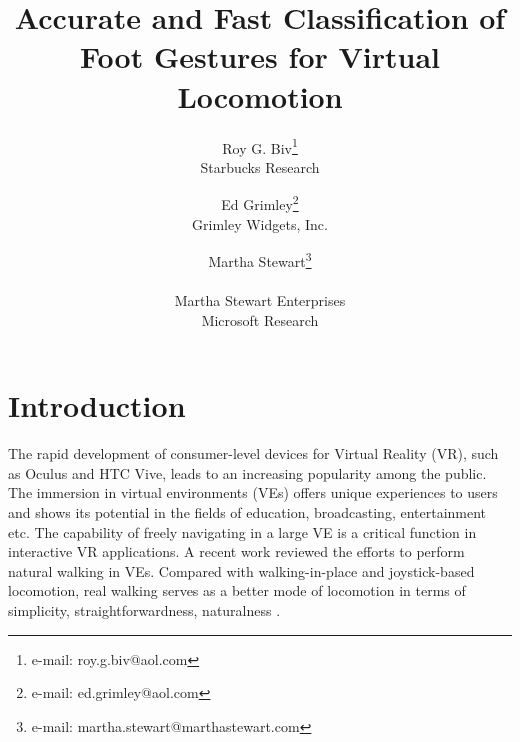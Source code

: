 \documentclass[review]{vgtc}                 %
\title{Accurate and Fast Classification of Foot Gestures for Virtual Locomotion}
\author{Roy G. Biv\thanks{e-mail: roy.g.biv@aol.com}\\ %
        \scriptsize Starbucks Research %
\and Ed Grimley\thanks{e-mail: ed.grimley@aol.com}\\ %
     \scriptsize Grimley Widgets, Inc. %
\and Martha Stewart\thanks{e-mail: martha.stewart@marthastewart.com}\\ %
     \parbox{1.4in}{\scriptsize \centering Martha Stewart Enterprises \\ Microsoft Research}}
\begin{document}
\newcommand{\shihuinote}[1]{\textcolor{red}{#1}}


\maketitle


\section{Introduction}
\label{sec:introduction}
The rapid development of consumer-level devices for Virtual Reality (VR), such as Oculus and HTC Vive, leads to an increasing popularity among the public.
The immersion in virtual environments (VEs) offers unique experiences to users and shows its potential in the fields of education, broadcasting, entertainment etc.
The capability of freely navigating in a large VE is a critical function in interactive VR applications.
A recent work \cite{nilsson2018natural} reviewed the efforts to perform natural walking in VEs.
Compared with walking-in-place and joystick-based locomotion, real walking serves as a better mode of locomotion in terms of simplicity, straightforwardness, naturalness \cite{usoh1999walking,dong2017smooth,nilsson2018natural}.
\end{document}
